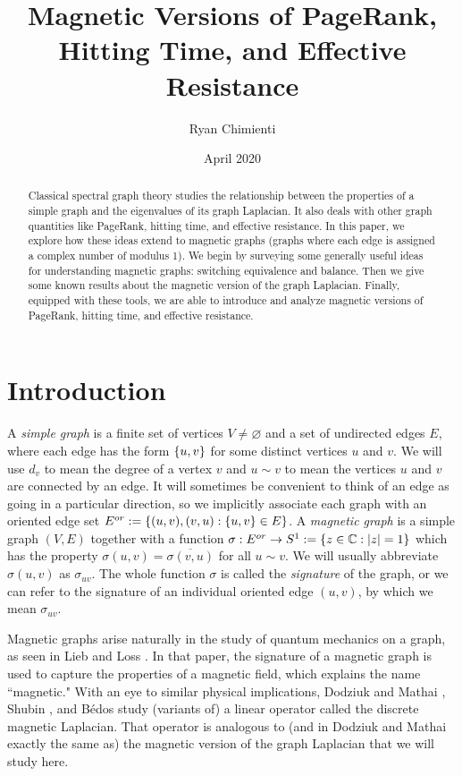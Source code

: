 \documentclass{article}
\title{Magnetic Versions of PageRank, Hitting Time, and Effective Resistance}
\author{Ryan Chimienti}
\date{April 2020}
\theoremstyle{definition}
\newcommand{\C}{\mathbb C}
\DeclarePairedDelimiter\abs{\lvert}{\rvert}
\DeclarePairedDelimiter\set{\{}{\}}
\begin{document}
\maketitle

\begin{abstract}
    Classical spectral graph theory studies the relationship between the properties of a simple graph and the eigenvalues of its graph Laplacian. It also deals with other graph quantities like PageRank, hitting time, and effective resistance. In this paper, we explore how these ideas extend to magnetic graphs (graphs where each edge is assigned a complex number of modulus 1). We begin by surveying some generally useful ideas for understanding magnetic graphs: switching equivalence and balance. Then we give some known results about the magnetic version of the graph Laplacian. Finally, equipped with these tools, we are able to introduce and analyze magnetic versions of PageRank, hitting time, and effective resistance.
\end{abstract}

\section{Introduction}

A \textit{simple graph} is a finite set of vertices $V \neq \varnothing$ and a set of undirected edges $E$, where each edge has the form $\set{u, v}$ for some distinct vertices $u$ and $v$. We will use $d_v$ to mean the degree of a vertex $v$ and $u \sim v$ to mean the vertices $u$ and $v$ are connected by an edge. It will sometimes be convenient to think of an edge as going in a particular direction, so we implicitly associate each graph with an oriented edge set $E^{or} := \set{(u, v), (v, u) : \set*{u, v} \in E}$. A \textit{magnetic graph} is a simple graph $(V, E)$ together with a function $\sigma : E^{or} \rightarrow S^1 := \set*{z \in \C : \abs*{z} = 1}$ which has the property $\sigma (u, v) = \overline{\sigma (v, u)}$ for all $u \sim v$. We will usually abbreviate $\sigma(u, v)$ as $\sigma_{uv}$. The whole function $\sigma$ is called the \textit{signature} of the graph, or we can refer to the signature of an individual oriented edge $(u, v)$, by which we mean $\sigma_{uv}$.

Magnetic graphs arise naturally in the study of quantum mechanics on a graph, as seen in Lieb and Loss \cite{lieb}. In that paper, the signature of a magnetic graph is used to capture the properties of a magnetic field, which explains the name ``magnetic." With an eye to similar physical implications, Dodziuk and Mathai \cite{dodziuk} , Shubin \cite{shubin}, and B\'edos \cite{bedos} study (variants of) a linear operator called the discrete magnetic Laplacian. That operator is analogous to (and in Dodziuk and Mathai exactly the same as)  the magnetic version of the graph Laplacian that we will study here. 
\end{document}
